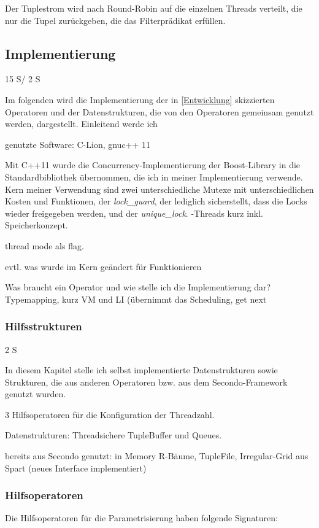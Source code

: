 \documentclass[a4paper,12pt,twoside]{article}
\newcommand{\Fb}[1]{\textit{#1}} %
\begin{document}
Der Tuplestrom wird nach Round-Robin auf die einzelnen Threads verteilt, die nur die Tupel zurückgeben, die das Filterprädikat erfüllen.

\subsection{Implementierung} 15 S/ 2 S
\label{Implemeniterung} 

Im folgenden wird die Implementierung der in \autoref{Entwicklung} skizzierten Operatoren und der Datenstrukturen, die von den Operatoren gemeinsam genutzt werden, dargestellt. Einleitend werde ich 

genutzte Software: C-Lion, gnuc++ 11

Mit C++11 wurde die Concurrency-Implementierung der Boost-Library in die Standardbibliothek übernommen, die ich in meiner Implementierung verwende. Kern meiner Verwendung sind zwei unterschiedliche Mutexe mit unterschiedlichen Kosten und Funktionen, der \Fb{lock\_guard}, der lediglich sicherstellt, dass die Locks wieder freigegeben werden, und der \Fb{unique\_lock}. -Threads kurz inkl. Speicherkonzept.

thread mode als flag.

evtl. was wurde im Kern geändert für Funktionieren

Was braucht ein Operator und wie stelle ich die Implementierung dar? Typemapping, kurz VM und LI (übernimmt das Scheduling, get next

\subsubsection{Hilfsstrukturen} 2 S
\label{Hilfsstrukturen} 

In diesem Kapitel stelle ich  selbst implementierte Datenstrukturen sowie Strukturen, die aus anderen Operatoren bzw. aus dem Secondo-Framework genutzt wurden.

3 Hilfsoperatoren für die Konfiguration der Threadzahl.

Datenstrukturen:
Threadsichere TupleBuffer und Queues. 

bereits aus Secondo genutzt: 
in Memory R-Bäume, TupleFile, Irregular-Grid aus Spart (neues Interface implementiert)


\subsubsection{Hilfsoperatoren}

Die Hilfsoperatoren für die Parametrisierung haben folgende Signaturen:
\end{document}
